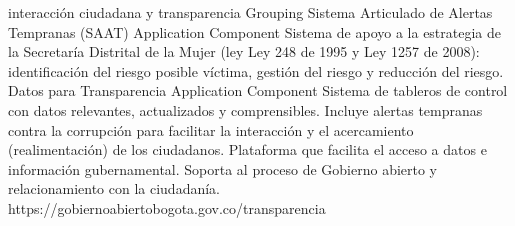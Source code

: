 \documentclass[
	a4paper, %
	12pt, %
]{include/CSSullivanBusinessReport}
\begin{document}
interacción ciudadana y transparencia \textbar{} Grouping \textbar{}
\textbar{} \textbar{} Sistema Articulado de Alertas Tempranas (SAAT)
\textbar{} Application Component \textbar{} Sistema de apoyo a la
estrategia de la Secretaría Distrital de la Mujer (ley Ley 248 de 1995 y
Ley 1257 de 2008): identificación del riesgo posible víctima, gestión
del riesgo y reducción del riesgo. \textbar{} \textbar{} Datos para
Transparencia \textbar{} Application Component \textbar{} Sistema de
tableros de control con datos relevantes, actualizados y comprensibles.
Incluye alertas tempranas contra la corrupción para facilitar la
interacción y el acercamiento (realimentación) de los ciudadanos.
Plataforma que facilita el acceso a datos e información gubernamental.
Soporta al proceso de Gobierno abierto y relacionamiento con la
ciudadanía. https://gobiernoabiertobogota.gov.co/transparencia
\end{document}
